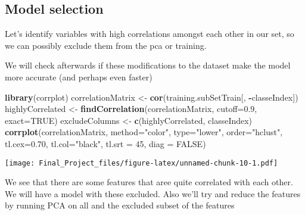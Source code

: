 \documentclass[]{article}
\newenvironment{Shaded}{\begin{snugshade}}{\end{snugshade}}
\newcommand{\DataTypeTok}[1]{\textcolor[rgb]{0.13,0.29,0.53}{#1}}
\newcommand{\DecValTok}[1]{\textcolor[rgb]{0.00,0.00,0.81}{#1}}
\newcommand{\FloatTok}[1]{\textcolor[rgb]{0.00,0.00,0.81}{#1}}
\newcommand{\KeywordTok}[1]{\textcolor[rgb]{0.13,0.29,0.53}{\textbf{#1}}}
\newcommand{\NormalTok}[1]{#1}
\newcommand{\OperatorTok}[1]{\textcolor[rgb]{0.81,0.36,0.00}{\textbf{#1}}}
\newcommand{\OtherTok}[1]{\textcolor[rgb]{0.56,0.35,0.01}{#1}}
\newcommand{\StringTok}[1]{\textcolor[rgb]{0.31,0.60,0.02}{#1}}
\begin{document}
\hypertarget{model-selection}{%
\subsection{Model selection}\label{model-selection}}

Let's identify variables with high correlations amongst each other in
our set, so we can possibly exclude them from the pca or training.

We will check afterwards if these modifications to the dataset make the
model more accurate (and perhaps even faster)

\begin{Shaded}
\begin{Highlighting}[]
\KeywordTok{library}\NormalTok{(corrplot)}
\NormalTok{correlationMatrix <-}\StringTok{ }\KeywordTok{cor}\NormalTok{(training.subSetTrain[, }\OperatorTok{-}\NormalTok{classeIndex])}
\NormalTok{highlyCorrelated <-}\StringTok{ }\KeywordTok{findCorrelation}\NormalTok{(correlationMatrix, }\DataTypeTok{cutoff=}\FloatTok{0.9}\NormalTok{, }\DataTypeTok{exact=}\OtherTok{TRUE}\NormalTok{)}
\NormalTok{excludeColumns <-}\StringTok{ }\KeywordTok{c}\NormalTok{(highlyCorrelated, classeIndex)}
\KeywordTok{corrplot}\NormalTok{(correlationMatrix, }\DataTypeTok{method=}\StringTok{"color"}\NormalTok{, }\DataTypeTok{type=}\StringTok{"lower"}\NormalTok{, }\DataTypeTok{order=}\StringTok{"hclust"}\NormalTok{, }\DataTypeTok{tl.cex=}\FloatTok{0.70}\NormalTok{, }\DataTypeTok{tl.col=}\StringTok{"black"}\NormalTok{, }\DataTypeTok{tl.srt =} \DecValTok{45}\NormalTok{, }\DataTypeTok{diag =} \OtherTok{FALSE}\NormalTok{)}
\end{Highlighting}
\end{Shaded}

\texttt{[image: Final\_Project\_files/figure-latex/unnamed-chunk-10-1.pdf]}

We see that there are some features that aree quite correlated with each
other. We will have a model with these excluded. Also we'll try and
reduce the features by running PCA on all and the excluded subset of the
features
\end{document}
